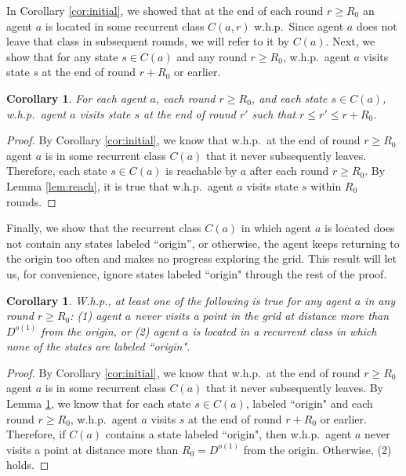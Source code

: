 \documentclass[11pt]{article}
\newtheorem{corollary}[theorem]{Corollary}
\begin{document}
In Corollary \ref{cor:initial}, we showed that at the end of each round $r \geq R_0$ an agent $a$ is located in some recurrent class $C(a,r)$ w.h.p.\ Since agent $a$ does not leave that class in subsequent rounds, we will refer to it by $C(a)$. Next, we show that for any state $s \in C(a)$ and any round $r \geq R_0$, w.h.p.\ agent $a$ visits state $s$ at the end of round $r+R_0$ or earlier.

\begin{corollary}
\label{cor:visits}
For each agent $a$, each round $r \geq R_0$, and each state $s \in C(a)$, w.h.p.\ agent $a$ visits state $s$ at the end of round $r'$ such that $r \leq r' \leq r+R_0$.
\end{corollary}

\begin{proof}
	By Corollary \ref{cor:initial}, we know that w.h.p.\ at the end of round $r \geq R_0$ agent $a$ is in some recurrent class $C(a)$ that it never subsequently leaves. Therefore, each state $s \in C(a)$ is reachable by $a$ after each round $r \geq R_0$. By Lemma \ref{lem:reach},  it is true that w.h.p.\ agent $a$ visits state $s$ within $R_0$ rounds.
\end{proof}

Finally, we show that the recurrent class $C(a)$ in which agent $a$ is located does not contain any states labeled ``origin'', or otherwise, the agent keeps returning to the origin too often and makes no progress exploring the grid. This result will let us, for convenience, ignore states labeled ``origin" through the rest of the proof.

\begin{corollary}
\label{cor:origin}
W.h.p., at least one of the following is true for any agent $a$ in any round $r \geq R_0$: (1) agent $a$ never visits a point in the grid at distance more than $D^{o(1)}$ from the origin, or (2) agent $a$ is located in a recurrent class in which none of the states are labeled ``origin".
\end{corollary}
\begin{proof}
	By Corollary \ref{cor:initial}, we know that w.h.p.\ at the end of round $r \geq R_0$ agent $a$ is in some recurrent class $C(a)$ that it never subsequently leaves. By Lemma \ref{cor:visits}, we know that for each state $s \in C(a)$, labeled ``origin" and each round $r \geq R_0$, w.h.p.\ agent $a$ visits $s$ at the end of round $r+R_0$ or earlier. Therefore, if $C(a)$ contains a state labeled ``origin", then w.h.p.\ agent $a$ never visits a point at distance more than $R_0 = D^{o(1)}$ from the origin. Otherwise, (2) holds.
\end{proof}
\end{document}
